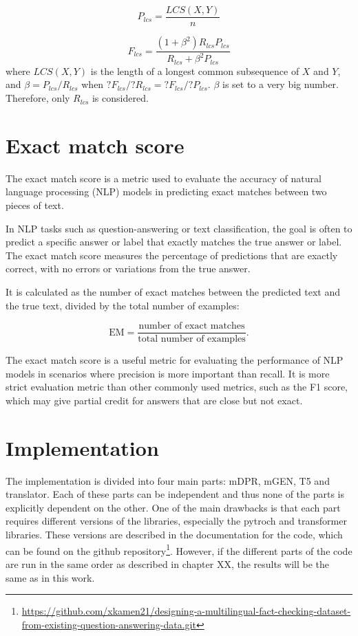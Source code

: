 \begin{equation}
    P_{lcs} = \frac{LCS(X,Y)}{n}
\end{equation}

\begin{equation}
    F_{lcs} = \frac{(1 + \beta^2)R_{lcs}P_{lcs}}{R_{lcs}+\beta^2P_{lcs}}
\end{equation}
where $LCS(X,Y)$ is the length of a longest common subsequence of $X$ and $Y$, and $\beta = P_{lcs}/R_{lcs}$ when $?F_{lcs}/?R_{lcs} = ?F_{lcs}/?P_{lcs}$. $\beta$ is set to a very big number. Therefore, only $R_{lcs}$ is considered.

\section{Exact match score}\label{exact_match}
The exact match score is a metric used to evaluate the accuracy of natural language processing (NLP) models in predicting exact matches between two pieces of text.

In NLP tasks such as question-answering or text classification, the goal is often to predict a specific answer or label that exactly matches the true answer or label. The exact match score measures the percentage of predictions that are exactly correct, with no errors or variations from the true answer.

It is calculated as the number of exact matches between the predicted text and the true text, divided by the total number of examples:

\begin{equation}
   \text{EM} = \frac{\text{number of exact matches}}{\text{total number of examples}}.
\end{equation}

The exact match score is a useful metric for evaluating the performance of NLP models in scenarios where precision is more important than recall. It is more strict evaluation metric than other commonly used metrics, such as the F1 score, which may give partial credit for answers that are close but not exact.

\section{Implementation}
The implementation is divided into four main parts: mDPR, mGEN, T5 and translator. Each of these parts can be independent and thus none of the parts is explicitly dependent on the other. One of the main drawbacks is that each part requires different versions of the libraries, especially the pytroch and transformer libraries. These versions are described in the documentation for the code, which can be found on the github repository\footnote{\url{https://github.com/xkamen21/designing-a-multilingual-fact-checking-dataset-from-existing-question-answering-data.git}}. However, if the different parts of the code are run in the same order as described in chapter XX, the results will be the same as in this work.

